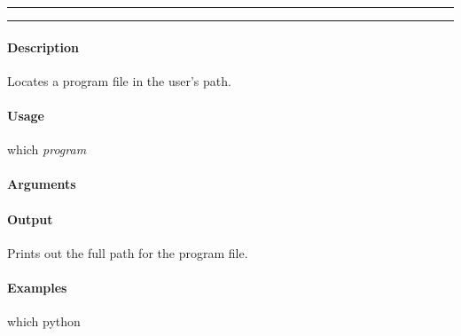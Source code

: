 \hrule
\vspace{1mm}
\hrule
\vspace{4mm}

\paragraph{Description}
\indentpar \raggedright \textrm{Locates a program file in the user's path.}\\

\paragraph{Usage}
\indentpar which \textit{program}

\paragraph{Arguments}
\indentpar {}

\paragraph{Output}
\indentpar \textrm{Prints out the full path for the program file.}

\paragraph{Examples}
\indentpar which python

\vspace{20mm}